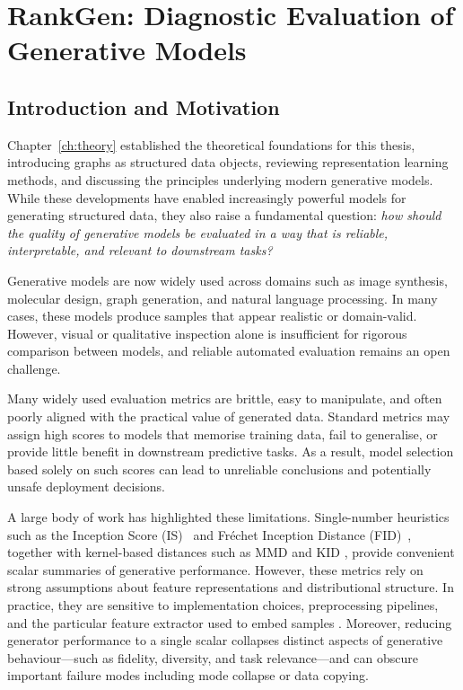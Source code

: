 \chapter{RankGen: Diagnostic Evaluation of Generative Models}
\label{ch:rankgen}

\section{Introduction and Motivation}
\label{sec:rankgen:intro}

Chapter~\ref{ch:theory} established the theoretical foundations for this
thesis, introducing graphs as structured data objects, reviewing
representation learning methods, and discussing the principles underlying
modern generative models. While these developments have enabled increasingly
powerful models for generating structured data, they also raise a fundamental
question: \emph{how should the quality of generative models be evaluated in a
way that is reliable, interpretable, and relevant to downstream tasks?}

Generative models are now widely used across domains such as image synthesis,
molecular design, graph generation, and natural language processing.
In many cases, these models produce samples that appear realistic or
domain-valid. However, visual or qualitative inspection alone is insufficient
for rigorous comparison between models, and reliable automated evaluation
remains an open challenge.

Many widely used evaluation metrics are brittle, easy to manipulate, and often
poorly aligned with the practical value of generated data. Standard metrics may
assign high scores to models that memorise training data, fail to generalise,
or provide little benefit in downstream predictive tasks. As a result, model
selection based solely on such scores can lead to unreliable conclusions and
potentially unsafe deployment decisions.

A large body of work has highlighted these limitations. Single-number
heuristics such as the Inception Score (IS)~\citep{salimans2016improved} and
Fr\'echet Inception Distance (FID)~\citep{heusel2017gans}, together with
kernel-based distances such as MMD and KID
\citep{gretton2012kernel,binkowski2018demystifying}, provide convenient scalar
summaries of generative performance. However, these metrics rely on strong
assumptions about feature representations and distributional structure.
In practice, they are sensitive to implementation choices, preprocessing
pipelines, and the particular feature extractor used to embed samples
\citep{barratt2018note,chong2020effectively,parmar2022aliased,
jayasumana2024rethinking,betzalel2022study}. Moreover, reducing generator
performance to a single scalar collapses distinct aspects of generative
behaviour---such as fidelity, diversity, and task relevance---and can obscure
important failure modes including mode collapse or data copying.

